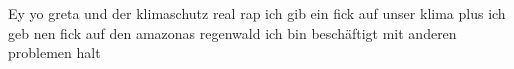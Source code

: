 \documentclass[a0paper,portrait]{baposter}
\begin{document}
    
Ey yo greta und der klimaschutz
real rap ich gib ein fick auf unser klima plus
ich geb nen fick auf den amazonas regenwald
ich bin beschäftigt mit anderen problemen halt
\end{document}

